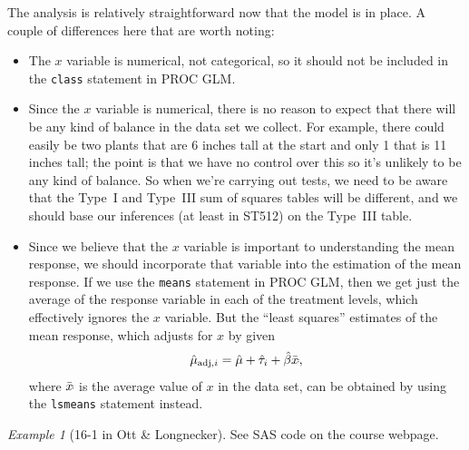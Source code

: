 \documentclass[a4paper, 12pt]{article}
\theoremstyle{plain}
\theoremstyle{definition}
\theoremstyle{remark}
\newtheorem*{example}{Example}
\begin{document}
The analysis is relatively straightforward now that the model is in place.  A couple of differences here that are worth noting:
\begin{itemize}
\item The $x$ variable is numerical, not categorical, so it should not be included in the {\tt class} statement in PROC GLM.  
\item Since the $x$ variable is numerical, there is no reason to expect that there will be any kind of balance in the data set we collect.  For example, there could easily be two plants that are 6 inches tall at the start and only 1 that is 11 inches tall; the point is that we have no control over this so it's unlikely to be any kind of balance.  So when we're carrying out tests, we need to be aware that the Type~I and Type~III sum of squares tables will be different, and we should base our inferences (at least in ST512) on the Type~III table.  
\item Since we believe that the $x$ variable is important to understanding the mean response, we should incorporate that variable into the estimation of the mean response.  If we use the {\tt means} statement in PROC GLM, then we get just the average of the response variable in each of the treatment levels, which effectively ignores the $x$ variable.  But the ``least squares'' estimates of the mean response, which adjusts for $x$ by given 
\[ \hat \mu_{\text{adj}, i} = \hat\mu + \hat\tau_i + \hat\beta \bar x_{\dot\dot}, \]
where $\bar x_{\dot\dot}$ is the average value of $x$ in the data set, can be obtained by using the {\tt lsmeans} statement instead.  
\end{itemize}

\begin{example}[16-1 in Ott \& Longnecker]
See SAS code on the course webpage.
\end{example}
\end{document}
